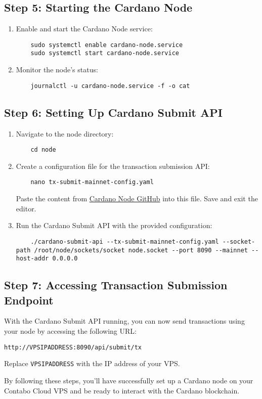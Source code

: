 \subsection{Step 5: Starting the Cardano Node}
\begin{enumerate}
    \item Enable and start the Cardano Node service:
    \begin{verbatim}
    sudo systemctl enable cardano-node.service
    sudo systemctl start cardano-node.service
    \end{verbatim}
    \item Monitor the node's status:
    \begin{verbatim}
    journalctl -u cardano-node.service -f -o cat
    \end{verbatim}
\end{enumerate}

\subsection{Step 6: Setting Up Cardano Submit API}
\begin{enumerate}
    \item Navigate to the node directory:
    \begin{verbatim}
    cd node
    \end{verbatim}
    \item Create a configuration file for the transaction submission API:
    \begin{verbatim}
    nano tx-submit-mainnet-config.yaml
    \end{verbatim}
    Paste the content from \href{https://github.com/input-output-hk/cardano-node/blob/master/cardano-submit-api/config/tx-submit-mainnet-config.yaml}{Cardano Node GitHub} into this file. Save and exit the editor.
    \item Run the Cardano Submit API with the provided configuration:
    \begin{verbatim}
    ./cardano-submit-api --tx-submit-mainnet-config.yaml --socket-path /root/node/sockets/socket node.socket --port 8090 --mainnet --host-addr 0.0.0.0
    \end{verbatim}
\end{enumerate}

\subsection{Step 7: Accessing Transaction Submission Endpoint}
With the Cardano Submit API running, you can now send transactions using your node by accessing the following URL:
\begin{verbatim}
http://VPSIPADDRESS:8090/api/submit/tx
\end{verbatim}
Replace \texttt{VPSIPADDRESS} with the IP address of your VPS.

By following these steps, you'll have successfully set up a Cardano node on your Contabo Cloud VPS and be ready to interact with the Cardano blockchain.
